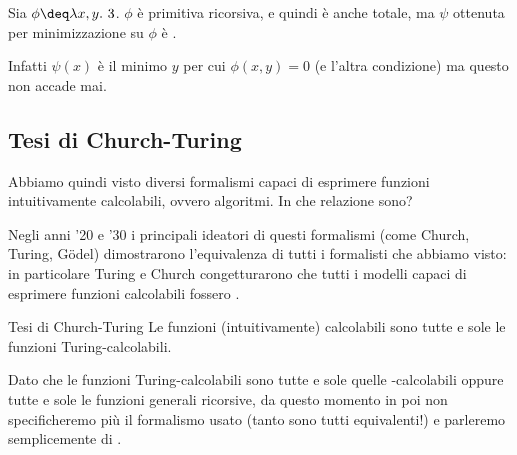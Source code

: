 \begin{example}
    Sia $\phi \deq \lam{x, y}{3}$. $\phi$ è primitiva ricorsiva, e quindi è anche totale, ma $\psi$ ottenuta per minimizzazione su $\phi$ è .
    
    Infatti $\psi(x)$ è il minimo $y$ per cui $\phi(x, y) = 0$ (e l'altra condizione) ma questo non accade mai.   
\end{example}

\subsection{Tesi di Church-Turing}

Abbiamo quindi visto diversi formalismi capaci di esprimere funzioni intuitivamente calcolabili, ovvero algoritmi. In che relazione sono?

Negli anni '20 e '30 i principali ideatori di questi formalismi (come Church, Turing, G\"odel) dimostrarono l'equivalenza di tutti i formalisti che abbiamo visto: in particolare Turing e Church congetturarono che tutti i modelli capaci di esprimere funzioni calcolabili fossero .

\begin{theorem}
    {Tesi di Church-Turing}{}
    Le funzioni (intuitivamente) calcolabili sono tutte e sole le funzioni Turing-calcolabili.
\end{theorem}

Dato che le funzioni Turing-calcolabili sono tutte e sole quelle \WHILE-calcolabili oppure tutte e sole le funzioni generali ricorsive, da questo momento in poi non specificheremo più il formalismo usato (tanto sono tutti equivalenti!) e parleremo semplicemente di .